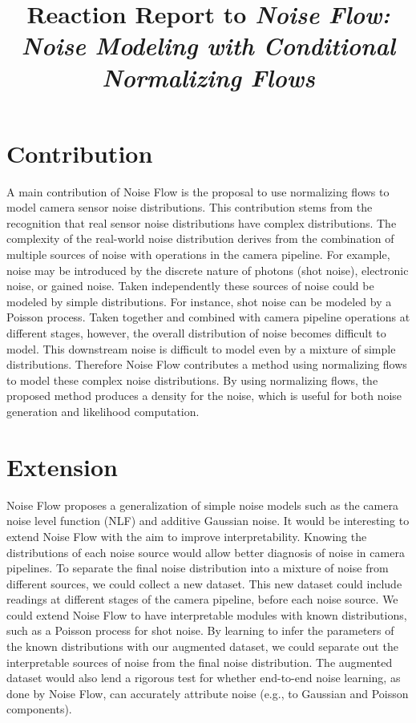 \documentclass{article}
\title{Reaction Report to \em{Noise Flow: Noise Modeling with Conditional Normalizing Flows}}
\begin{document}
\maketitle

\section{Contribution}

A main contribution of Noise Flow is the proposal to use normalizing flows to
model camera sensor noise distributions.
This contribution stems from the recognition that real sensor noise
distributions have complex distributions.
The complexity of the real-world noise distribution derives from the
combination of multiple sources of noise with operations in the camera
pipeline.
For example, noise may be introduced by the discrete nature of photons (shot
noise), electronic noise, or gained noise.
Taken independently these sources of noise could be modeled by simple
distributions.
For instance, shot noise can be modeled by a Poisson process.
Taken together and combined with camera pipeline operations at different
stages, however, the overall distribution of noise becomes difficult to model.
This downstream noise is difficult to model even by a mixture of simple distributions.
Therefore Noise Flow contributes a method using normalizing flows to model
these complex noise distributions.
By using normalizing flows, the proposed method produces a density for the
noise, which is useful for both noise generation and likelihood computation.


\section{Extension}

Noise Flow proposes a generalization of simple noise models such
as the camera noise level function (NLF) and additive Gaussian noise.
It would be interesting to extend Noise Flow with the aim to improve
interpretability.
Knowing the distributions of each noise source would allow better diagnosis of
noise in camera pipelines.
To separate the final noise distribution into a mixture of noise from different
sources, we could collect a new dataset.
This new dataset could include readings at different stages of the camera
pipeline, before each noise source.
We could extend Noise Flow to have interpretable modules with known
distributions, such as a Poisson process for shot noise.
By learning to infer the parameters of the known distributions with our
augmented dataset, we could separate out the interpretable sources of noise
from the final noise distribution.
The augmented dataset would also lend a rigorous test for whether end-to-end
noise learning, as done by Noise Flow, can accurately attribute noise (e.g., to
Gaussian and Poisson components).
\end{document}
